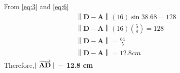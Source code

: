 \documentclass{article}
\providecommand{\norm}[1]{\left\lVert#1\right\rVert}
\let\vec\mathbf
\begin{document}
From \ref{eq:3} and \ref{eq:6}\\
\begin{align}
	\norm{\vec{D} - \vec{A}} (16) \sin{38.68} = 128\\
	\norm{\vec{D} - \vec{A}} (16) (\frac{5}{8}) = 128\\
	\norm{\vec{D} - \vec{A}} = \frac{64}{5}\\
	\norm{\vec{D} - \vec{A}} = 12.8cm\\
\end{align}
Therefore,$|\hspace{0.1cm}$\textbf{$\overrightarrow{\vec{AD}}\hspace{0.1cm} |$ = 12.8 cm}\\
\end{document}
